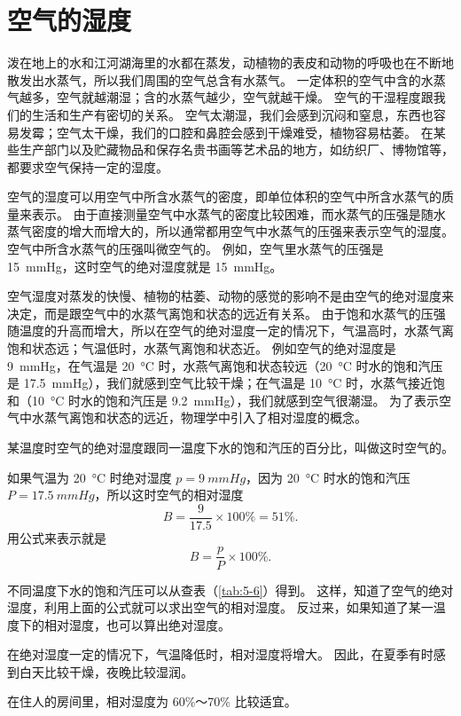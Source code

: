 \section{空气的湿度}
泼在地上的水和江河湖海里的水都在蒸发，动植物的表皮和动物的呼吸也在不断地散发出水蒸气，所以我们周围的空气总含有水蒸气。
一定体积的空气中含的水蒸气越多，空气就越潮湿；含的水蒸气越少，空气就越干燥。
空气的干湿程度跟我们的生活和生产有密切的关系。
空气太潮湿，我们会感到沉闷和窒息，东西也容易发霉；空气太干燥，我们的口腔和鼻腔会感到干燥难受，植物容易枯萎。
在某些生产部门以及贮藏物品和保存名贵书画等艺术品的地方，如纺织厂、博物馆等，都要求空气保持一定的湿度。

空气的湿度可以用空气中所含水蒸气的密度，即单位体积的空气中所含水蒸气的质量来表示。
由于直接测量空气中水蒸气的密度比较困难，而水蒸气的压强是随水蒸气密度的增大而增大的，所以通常都用空气中水蒸气的压强来表示空气的湿度。
空气中所含水蒸气的压强叫微空气的。
例如，空气里水蒸气的压强是 \qty{15}{mmHg}，这时空气的绝对湿度就是 \qty{15}{mmHg}。

空气湿度对蒸发的快慢、植物的枯萎、动物的感觉的影响不是由空气的绝对湿度来决定，而是跟空气中的水蒸气离饱和状态的远近有关系。
由于饱和水蒸气的压强随温度的升高而增大，所以在空气的绝对湿度一定的情况下，气温高时，水蒸气离饱和状态远；气温低时，水蒸气离饱和状态近。
例如空气的绝对湿度是 \qty{9}{mmHg}，在气温是 \qty{20}{\celsius} 时，水燕气离饱和状态较远（\qty{20}{\celsius} 时水的饱和汽压是 \qty{17.5}{mmHg}），我们就感到空气比较干燥；在气温是 \qty{10}{\celsius} 时，水蒸气接近饱和（\qty{10}{\celsius} 时水的饱和汽压是 \qty{9.2}{mmHg}），我们就感到空气很潮湿。
为了表示空气中水蒸气离饱和状态的远近，物理学中引入了相对湿度的概念。

某温度时空气的绝对湿度跟同一温度下水的饱和汽压的百分比，叫做这时空气的。

如果气温为 \qty{20}{\celsius} 时绝对湿度 $p=\qty{9}{mmHg}$，因为 \qty{20}{\celsius} 时水的饱和汽压 $P=\qty{17.5}{mmHg}$，所以这时空气的相对湿度
\[B=\frac{9}{17.5}\times 100\%=51\%. \]
用公式来表示就是
\[B=\frac{p}{P}\times 100\%.\]

不同温度下水的饱和汽压可以从查表（\cref{tab:5-6}）得到。
这样，知道了空气的绝对湿度，利用上面的公式就可以求出空气的相对湿度。
反过来，如果知道了某一温度下的相对湿度，也可以算出绝对湿度。

在绝对湿度一定的情况下，气温降低时，相对湿度将增大。
因此，在夏季有时感到白天比较干燥，夜晚比较湿润。

在住人的房间里，相对湿度为 60\%～70\% 比较适宜。

